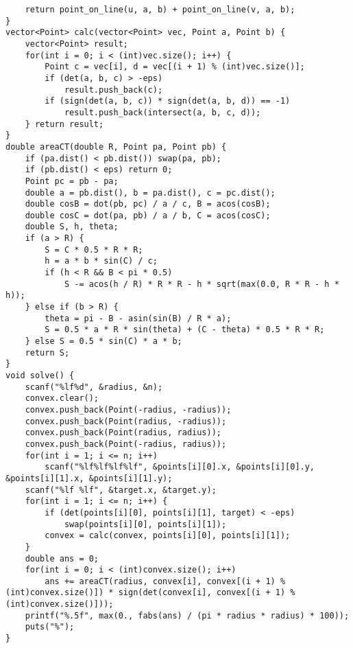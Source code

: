 \begin{lstlisting}
	return point_on_line(u, a, b) + point_on_line(v, a, b); 
}
vector<Point> calc(vector<Point> vec, Point a, Point b) {
	vector<Point> result;
	for(int i = 0; i < (int)vec.size(); i++) {
		Point c = vec[i], d = vec[(i + 1) % (int)vec.size()];
		if (det(a, b, c) > -eps)
			result.push_back(c);
		if (sign(det(a, b, c)) * sign(det(a, b, d)) == -1)
			result.push_back(intersect(a, b, c, d));
	} return result;
}
double areaCT(double R, Point pa, Point pb) {
	if (pa.dist() < pb.dist()) swap(pa, pb);
	if (pb.dist() < eps) return 0;
	Point pc = pb - pa;
	double a = pb.dist(), b = pa.dist(), c = pc.dist();
	double cosB = dot(pb, pc) / a / c, B = acos(cosB);
	double cosC = dot(pa, pb) / a / b, C = acos(cosC);
	double S, h, theta;
	if (a > R) {
		S = C * 0.5 * R * R;
		h = a * b * sin(C) / c;
		if (h < R && B < pi * 0.5) 
			S -= acos(h / R) * R * R - h * sqrt(max(0.0, R * R - h * h));
	} else if (b > R) {
		theta = pi - B - asin(sin(B) / R * a);
		S = 0.5 * a * R * sin(theta) + (C - theta) * 0.5 * R * R;
	} else S = 0.5 * sin(C) * a * b;
	return S;
}
void solve() {
	scanf("%lf%d", &radius, &n);
	convex.clear();
	convex.push_back(Point(-radius, -radius));
	convex.push_back(Point(radius, -radius));
	convex.push_back(Point(radius, radius));
	convex.push_back(Point(-radius, radius));
	for(int i = 1; i <= n; i++)
		scanf("%lf%lf%lf%lf", &points[i][0].x, &points[i][0].y, &points[i][1].x, &points[i][1].y);
	scanf("%lf %lf", &target.x, &target.y);
	for(int i = 1; i <= n; i++) {
		if (det(points[i][0], points[i][1], target) < -eps)
			swap(points[i][0], points[i][1]);
		convex = calc(convex, points[i][0], points[i][1]);
	}
	double ans = 0;
	for(int i = 0; i < (int)convex.size(); i++)
		ans += areaCT(radius, convex[i], convex[(i + 1) % (int)convex.size()]) * sign(det(convex[i], convex[(i + 1) % (int)convex.size()]));
	printf("%.5f", max(0., fabs(ans) / (pi * radius * radius) * 100));
	puts("%");
}
\end{lstlisting}
